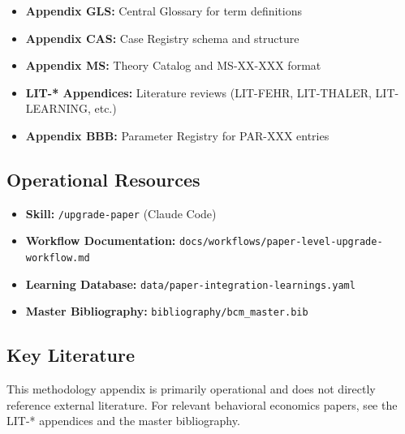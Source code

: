 \begin{itemize}
    \item \textbf{Appendix GLS:} Central Glossary for term definitions
    \item \textbf{Appendix CAS:} Case Registry schema and structure
    \item \textbf{Appendix MS:} Theory Catalog and MS-XX-XXX format
    \item \textbf{LIT-* Appendices:} Literature reviews (LIT-FEHR, LIT-THALER, LIT-LEARNING, etc.)
    \item \textbf{Appendix BBB:} Parameter Registry for PAR-XXX entries
\end{itemize}

\subsection{Operational Resources}

\begin{itemize}
    \item \textbf{Skill:} \texttt{/upgrade-paper} (Claude Code)
    \item \textbf{Workflow Documentation:} \texttt{docs/workflows/paper-level-upgrade-workflow.md}
    \item \textbf{Learning Database:} \texttt{data/paper-integration-learnings.yaml}
    \item \textbf{Master Bibliography:} \texttt{bibliography/bcm\_master.bib}
\end{itemize}

\subsection{Key Literature}

This methodology appendix is primarily operational and does not directly reference
external literature. For relevant behavioral economics papers, see the LIT-* appendices
and the master bibliography.

\nocite{bcm_master}


